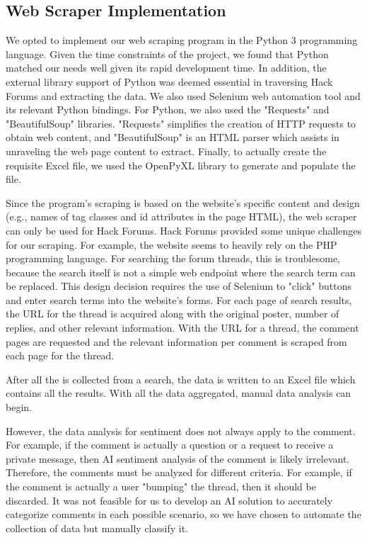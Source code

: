 \documentclass[sigconf]{acmart}
\begin{document}
\subsection{Web Scraper Implementation}
We opted to implement our web scraping program in the Python 3 programming
language. Given the time constraints of the project, we found that Python
matched our needs well given its rapid development time. In addition, the 
external library support of Python was deemed essential in traversing
Hack Forums and extracting the data. We also used Selenium web automation tool
and its relevant Python bindings. For Python, we also used the "Requests" and 
"BeautifulSoup" libraries. "Requests" simplifies the creation of HTTP requests 
to obtain web content, and "BeautifulSoup" is an HTML parser which assists
in unraveling the web page content to extract. Finally, to actually create
the requisite Excel file, we used the OpenPyXL library to generate and
populate the file. 

Since the program's scraping is based on the website's specific content and 
design (e.g., names of tag classes and id attributes in the page HTML), the web
scraper can only be used for Hack Forums. Hack Forums provided some unique
challenges for our scraping. For example, the website seems to heavily rely
on the PHP programming language. For searching the forum threads, this is 
troublesome, because the search itself is not a simple web endpoint where the 
search term can be replaced. This design decision requires the use of Selenium
to "click" buttons and enter search terms into the website's forms. For each
page of search results, the URL for the thread is acquired along with the 
original poster, number of replies, and other relevant information. With the 
URL for a thread, the comment pages are requested and the relevant information
per comment is scraped from each page for the thread.

After all the is collected from a search, the data is written to an Excel file
which contains all the results. With all the data aggregated, manual data
analysis can begin.

However, the data analysis for sentiment does not always apply to the comment.
For example, if the comment is actually a question or a request to receive a 
private message, then AI sentiment analysis of the comment is likely irrelevant.
Therefore, the comments must be analyzed for different criteria. For example, 
if the comment is actually a user "bumping" the thread, then it should be 
discarded. It was not feasible for us to develop an AI solution to accurately
categorize comments in each possible scenario, so we have chosen to automate
the collection of data but manually classify it.
\end{document}

